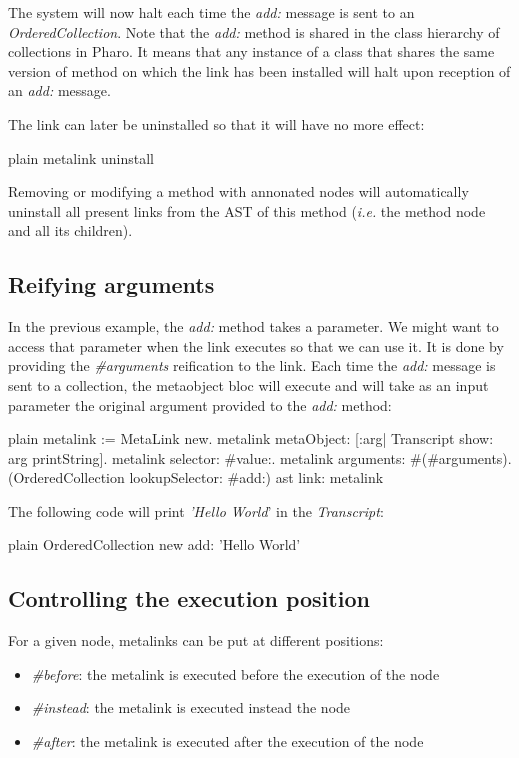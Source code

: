 \documentclass[10pt,twoside,english]{_support/latex/sbabook/sbabook}
\begin{document}
The system will now halt each time the \textit{add:} message is sent to an \textit{OrderedCollection}. Note that the \textit{add:} method is shared in the class hierarchy of collections in Pharo. It means that any instance of a class that shares the same version of method on which the link has been installed will halt upon reception of an \textit{add:} message.

The link can later be uninstalled so that it will have no more effect:

\begin{displaycode}{plain}
metalink uninstall
\end{displaycode}

Removing or modifying a method with annonated nodes will automatically uninstall all present links from the AST of this method
(\textit{i.e.} the method node and all its children).
\subsection{Reifying arguments}
In the previous example, the \textit{add:} method takes a parameter. We might want to access that parameter when the link executes so that we can use it. It is done by providing the \textit{\#arguments} reification to the link. Each time the \textit{add:} message is sent to a collection, the metaobject bloc will execute and will take as an input parameter the original argument provided to the \textit{add:} method:

\begin{displaycode}{plain}
metalink := MetaLink new.
metalink metaObject: [:arg| Transcript show: arg printString].
metalink selector: #value:.
metalink arguments: #(#arguments).
(OrderedCollection lookupSelector: #add:) ast link: metalink
\end{displaycode}

The following code will print \textit{'Hello World}' in the \textit{Transcript}:

\begin{displaycode}{plain}
OrderedCollection new add: 'Hello World'
\end{displaycode}
\subsection{Controlling the execution position}
For a given node, metalinks can be put at different positions:

\begin{itemize}
\item \textit{\#before}: the metalink is executed before the execution of the node
\item \textit{\#instead}: the metalink is executed instead the node
\item \textit{\#after}: the metalink is executed after the execution of the node
\end{itemize}
\end{document}

